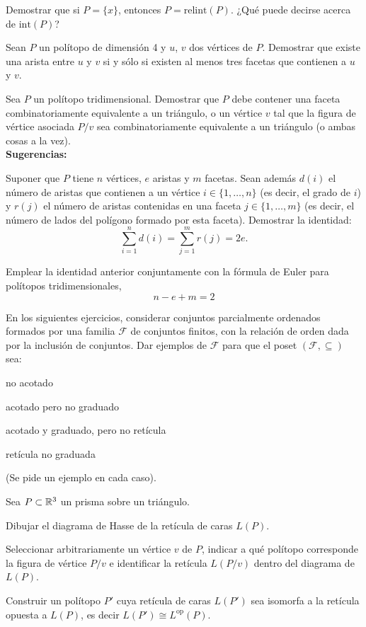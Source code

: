 \documentclass[a4paper,12pt]{article}
\newcommand{\relint}[1]{\mathrm{relint}\left(#1\right)}
\newcommand{\inter}[1]{\mathrm{int}\left(#1\right)}
\newcommand{\FF}{\mathcal{F}}
\begin{document}
\begin{exerciselist}
\item Demostrar que si $P = \{ x \}$, entonces $P=\relint{P}$. ¿Qué puede decirse acerca de $\inter{P}$?

\item Sean $P$ un polítopo de dimensión 4 y $u$, $v$ dos vértices de $P$. Demostrar
que existe una arista entre $u$ y $v$ si y sólo si existen al menos tres facetas que
contienen a $u$ y $v$.

\item Sea $P$ un polítopo tridimensional. Demostrar que $P$ debe contener una faceta
combinatoriamente equivalente a un triángulo, o un vértice
$v$ tal que la figura de vértice asociada $P / v$ sea combinatoriamente equivalente
a un triángulo (o ambas cosas a la vez).\\
\textbf{Sugerencias:}
\begin{exerciselist}
\item Suponer que $P$ tiene $n$ vértices, $e$ aristas y $m$ facetas. Sean además
$d(i)$ el número de aristas que contienen
a un vértice $i \in \{1, \ldots, n\}$ (es decir, el grado de $i$) y $r(j)$ el número de aristas contenidas en una faceta $j  \in \{1, \ldots, m\}$ (es decir, el número de lados del polígono formado por esta faceta).
Demostrar la identidad:
$$
\sum_{i=1}^n d(i) = \sum_{j=1}^m  r(j) = 2e.
$$
\item Emplear la identidad anterior conjuntamente con la fórmula de Euler para polítopos tridimensionales,
$$
n - e + m = 2
$$
\end{exerciselist}

\item En los siguientes ejercicios, considerar conjuntos parcialmente ordenados formados por una familia $\FF$ de conjuntos finitos, con la relación de orden dada por la inclusión de conjuntos. Dar ejemplos de $\FF$ para que el poset $(\FF, \subseteq)$ sea:
\begin{exerciselist}
\item no acotado
\item acotado pero no graduado
\item acotado y graduado, pero no retícula
\item retícula no graduada
\end{exerciselist}
(Se pide un ejemplo en cada caso).

\item Sea $P \subset \mathbb{R}^3$ un prisma sobre un triángulo.
\begin{exerciselist}
  \item Dibujar el diagrama de Hasse de la retícula de caras $L(P)$.
  \item Seleccionar arbitrariamente un vértice $v$ de $P$, indicar a qué polítopo corresponde la figura de vértice $P/v$ e identificar la retícula $L(P/v)$ dentro del diagrama de $L(P)$.
  \item Construir un polítopo $P'$ cuya retícula de caras $L(P')$ sea isomorfa a la retícula opuesta a $L(P)$,
  es decir $L(P') \cong L^{\textrm{op}}(P)$.
\end{exerciselist}


\end{exerciselist}
\end{document}
